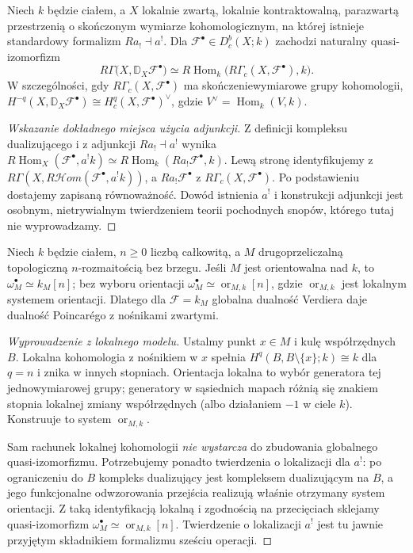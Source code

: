 \begin{twierdzenie}
\label{thm:verdier-global-v12}
Niech $k$ będzie ciałem, a $X$ lokalnie zwartą,
lokalnie kontraktowalną,
parazwartą przestrzenią o skończonym wymiarze kohomologicznym,
na której istnieje standardowy formalizm $Ra_!\dashv a^!$.
Dla $\mathcal F^\bullet\in D^b_c(X;k)$ zachodzi
naturalny quasi-izomorfizm
\[
R\Gamma\bigl(X,\mathbb D_X\mathcal F^\bullet\bigr)
\simeq R\!\operatorname{Hom}_k
\bigl(R\Gamma_c(X,\mathcal F^\bullet),k\bigr).
\]
W szczególności, gdy $R\Gamma_c(X,\mathcal F^\bullet)$
ma skończeniewymiarowe grupy kohomologii,
$H^{-q}(X,\mathbb D_X\mathcal F^\bullet)
\cong H_c^q(X,\mathcal F^\bullet)^\vee$,
gdzie $V^\vee=\operatorname{Hom}_k(V,k)$.
\end{twierdzenie}
\begin{proof}[Wskazanie dokładnego miejsca użycia adjunkcji]
Z definicji kompleksu dualizującego i z adjunkcji
$Ra_!\dashv a^!$ wynika
$R\!\operatorname{Hom}_X(\mathcal F^\bullet,a^!k)
\simeq R\!\operatorname{Hom}_k(Ra_!\mathcal F^\bullet,k)$.
Lewą stronę identyfikujemy z
$R\Gamma(X,R\mathcal Hom(\mathcal F^\bullet,a^!k))$,
a $Ra_!\mathcal F^\bullet$ z
$R\Gamma_c(X,\mathcal F^\bullet)$.
Po podstawieniu dostajemy zapisaną równoważność.
Dowód istnienia $a^!$ i konstrukcji adjunkcji jest
osobnym, nietrywialnym twierdzeniem teorii pochodnych
snopów, którego tutaj nie wyprowadzamy.
\end{proof}

\begin{twierdzenie}
\label{thm:verdier-manifold-v12}
Niech $k$ będzie ciałem, $n\ge0$ liczbą całkowitą,
a $M$ drugoprzeliczalną topologiczną $n$-rozmaitością
bez brzegu. Jeśli $M$ jest orientowalna nad $k$, to
$\omega_M^\bullet\simeq k_M[n]$; bez wyboru orientacji
$\omega_M^\bullet\simeq\operatorname{or}_{M,k}[n]$,
gdzie $\operatorname{or}_{M,k}$ jest lokalnym systemem orientacji.
Dlatego dla $\mathcal F=k_M$ globalna dualność Verdiera
daje dualność Poincarégo z nośnikami zwartymi.
\end{twierdzenie}
\begin{proof}[Wyprowadzenie z lokalnego modelu]
Ustalmy punkt $x\in M$ i kulę współrzędnych $B$.
Lokalna kohomologia z nośnikiem w $x$ spełnia
$H^q(B,B\setminus\{x\};k)\cong k$ dla $q=n$
i znika w innych stopniach. Orientacja lokalna to
wybór generatora tej jednowymiarowej grupy; generatory
w sąsiednich mapach różnią się znakiem stopnia
lokalnej zmiany współrzędnych (albo działaniem $-1$
w ciele $k$). Konstruuje to system $\operatorname{or}_{M,k}$.

Sam rachunek lokalnej kohomologii \emph{nie wystarcza}
do zbudowania globalnego quasi-izomorfizmu. Potrzebujemy
ponadto twierdzenia o lokalizacji dla $a^!$:
po ograniczeniu do $B$ kompleks dualizujący jest
kompleksem dualizującym na $B$, a jego funkcjonalne
odwzorowania przejścia realizują właśnie otrzymany
system orientacji. Z taką identyfikacją lokalną i
zgodnością na przecięciach sklejamy quasi-izomorfizm
$\omega_M^\bullet\simeq\operatorname{or}_{M,k}[n]$.
Twierdzenie o lokalizacji $a^!$ jest tu jawnie
przyjętym składnikiem formalizmu sześciu operacji.
\end{proof}

